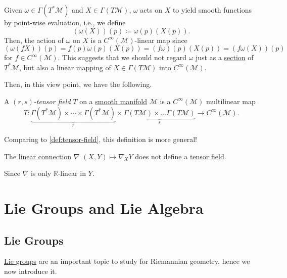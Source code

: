 \begin{eg}
	Given \(\omega \in \Gamma (T^{\ast} \mathcal{M} )\) and \(X\in \Gamma (T \mathcal{M} )\), \(\omega \) acts on \(X\) to yield smooth functions by point-wise evaluation, i.e., we define
	\[
		\left( \omega (X) \right) (p) \coloneqq \omega (p) (X(p)).
	\]
	Then, the action of \(\omega \) on \(X\) is a \(C^{\infty} (\mathcal{M} )\)-linear map since
	\[
		(\omega (fX))(p)
		= f(p) \omega (p) (X(p))
		= (f \omega )(p) (X(p))
		= (f \omega (X))(p)
	\]
	for \(f\in C^\infty (\mathcal{M} )\). This suggests that we should not regard \(\omega \) just as a \hyperref[def:section]{section} of \(T^{\ast} \mathcal{M} \), but also a linear mapping of \(X\in \Gamma (T \mathcal{M} )\) into \(C^{\infty} (\mathcal{M} )\).
\end{eg}

Then, in this view point, we have the following.

\begin{definition}\label{def:tensor-field*}
	A \emph{\((r, s)\)-tensor field} \(T\) on a \hyperref[def:smooth-manifold]{smooth manifold} \(\mathcal{M} \) is a \(C^{\infty} (\mathcal{M} )\) multilinear map
	\[
		T \colon \underbrace{\Gamma (T ^{\ast} \mathcal{M} ) \times \cdots \times \Gamma (T ^{\ast} \mathcal{M} )}_{r} \times \underbrace{\Gamma (T \mathcal{M} ) \times \dots \Gamma (T \mathcal{M} )}_{s} \to C^{\infty} (\mathcal{M} ).
	\]
\end{definition}

Comparing to \autoref{def:tensor-field}, this definition is more general!

\begin{eg}
	The \hyperref[def:linear-connection]{linear connection} \(\nabla \) \((X, Y) \mapsto \nabla _X Y\) does not define a \hyperref[def:tensor-field*]{tensor field}.
\end{eg}
\begin{explanation}
	Since \(\nabla \) is only \(\mathbb{R} \)-linear in \(Y\).
\end{explanation}

\section{Lie Groups and Lie Algebra}\label{section:Lie-group-and-Lie-algebra}
\subsection{Lie Groups}
\hyperref[def:Lie-group]{Lie groups} are an important topic to study for Riemannian geometry, hence we now introduce it.

